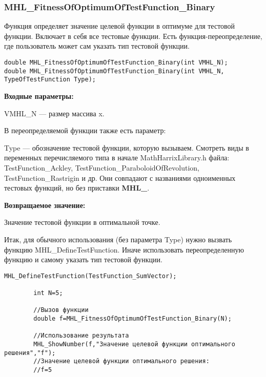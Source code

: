 \documentclass[a4paper,12pt]{article}
\begin{document}
\subsubsection{MHL\_FitnessOfOptimumOfTestFunction\_Binary}\label{MHL_FitnessOfOptimumOfTestFunction_Binary}

Функция определяет значение целевой функции в оптимуме для тестовой функции. Включает в себя все тестовые функции. Есть функция-переопределение, где пользователь может сам указать тип тестовой функции.


\begin{lstlisting}[label=code_syntax_MHL_FitnessOfOptimumOfTestFunction_Binary,caption=Синтаксис]
double MHL_FitnessOfOptimumOfTestFunction_Binary(int VMHL_N);
double MHL_FitnessOfOptimumOfTestFunction_Binary(int VMHL_N, TypeOfTestFunction Type);
\end{lstlisting}

\textbf{Входные параметры:}

VMHL\_N --- размер массива x.

В переопределяемой функции также есть параметр:
  
Type --- обозначение тестовой функции, которую вызываем.
Смотреть виды в переменных перечисляемого типа в начале MathHarrixLibrary.h файла: TestFunction\_Ackley, TestFunction\_ParaboloidOfRevolution, TestFunction\_Rastrigin и др. Они совпадают с названиями одноименных тестовых функций, но без приставки \textbf{MHL\_}.

\textbf{Возвращаемое значение:}
 
Значение тестовой функции в оптимальной точке.

Итак, для обычного использования (без параметра Type) нужно вызвать функцию MHL\_DefineTestFunction. Иначе использовать переопределенную функцию и самому указать тип тестовой функции.


\begin{lstlisting}[label=code_use_MHL_FitnessOfOptimumOfTestFunction_Binary,caption=Пример использования]
        MHL_DefineTestFunction(TestFunction_SumVector);

        int N=5;

        //Вызов функции
        double f=MHL_FitnessOfOptimumOfTestFunction_Binary(N);

        //Использование результата
        MHL_ShowNumber(f,"Значение целевой функции оптимального решения","f");
        //Значение целевой функции оптимального решения:
        //f=5
\end{lstlisting}
\end{document}

